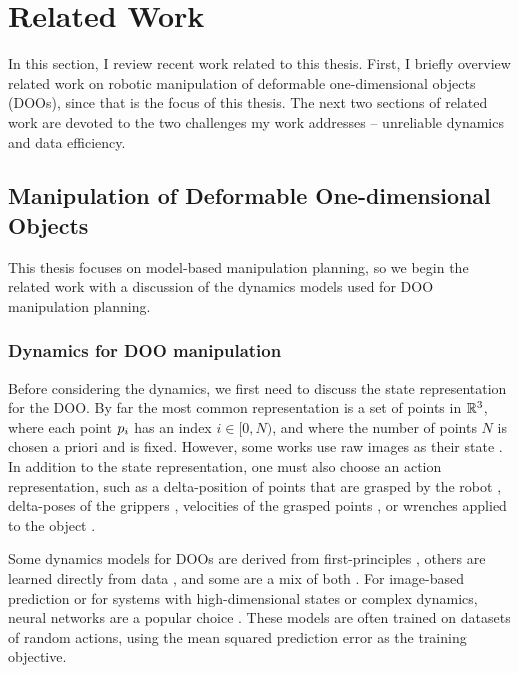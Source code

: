 \section{Related Work} \label{Intro:sec:related_work}

In this section, I review recent work related to this thesis. First, I briefly overview related work on robotic manipulation of deformable one-dimensional objects (DOOs), since that is the focus of this thesis. The next two sections of related work are devoted to the two challenges my work addresses -- unreliable dynamics and data efficiency.

\subsection{Manipulation of Deformable One-dimensional Objects}

This thesis focuses on model-based manipulation planning, so we begin the related work with a discussion of the dynamics models used for DOO manipulation planning.

\subsubsection{Dynamics for DOO manipulation}

Before considering the dynamics, we first need to discuss the state representation for the DOO. By far the most common representation is a set of points in $\mathbb{R}^3$, where each point $p_i$ has an index $i\in[0,N)$, and where the number of points $N$ is chosen a priori and is fixed. However, some works use raw images as their state \cite{Finn2017,Nagabandi2018,Wang2019,nagabandi19learning,Finn2017,HoqueCloth2020}. In addition to the state representation, one must also choose an action representation, such as a delta-position of points that are grasped by the robot \cite{ZixuanCloth21,lin2020softgym,HoqueCloth2020}, delta-poses of the grippers \cite{CJM}, velocities of the grasped points \cite{Propnet}, or wrenches applied to the object \cite{Rods2008,Lamiraux2001}.

Some dynamics models for DOOs are derived from first-principles \cite{Terzopoulos87,Lamiraux2001,Rods2008}, others are learned directly from data \cite{Finn2017,CFM,OfflineOnline22}, and some are a mix of both \cite{Propnet,li2022graph,holl2020learning}. For image-based prediction or for systems with high-dimensional states or complex dynamics, neural networks are a popular choice \cite{Goldberg1993,Finn2017,Nagabandi2018,Ichter2019,HoqueCloth2020}. These models are often trained on datasets of random actions, using the mean squared prediction error as the training objective.

